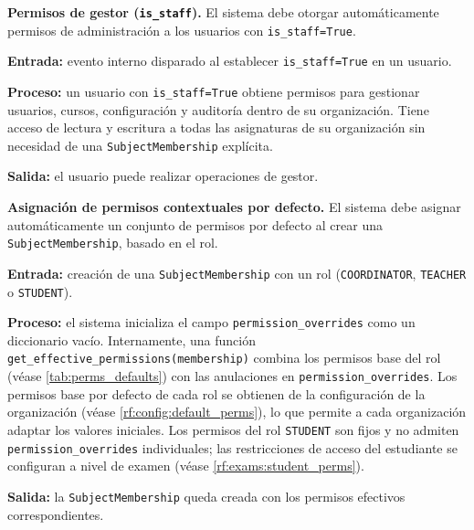 \begin{functional}

    \item \textbf{Permisos de gestor (\texttt{is\_staff}).} \label{rf:perms:staff}
    El sistema debe otorgar automáticamente permisos de administración a los usuarios con
    \texttt{is\_staff=True}.

    \textbf{Entrada:} evento interno disparado al establecer \texttt{is\_staff=True} en un
    usuario.

    \textbf{Proceso:} un usuario con \texttt{is\_staff=True} obtiene permisos para
    gestionar usuarios, cursos, configuración y auditoría dentro de su organización. Tiene
    acceso de lectura y escritura a todas las asignaturas de su organización sin necesidad
    de una \texttt{SubjectMembership} explícita.

    \textbf{Salida:} el usuario puede realizar operaciones de gestor.

    \item \textbf{Asignación de permisos contextuales por defecto.}
    \label{rf:perms:defaults}
    El sistema debe asignar automáticamente un conjunto de permisos por defecto al crear una
    \texttt{SubjectMembership}, basado en el rol.

    \textbf{Entrada:} creación de una \texttt{SubjectMembership} con un rol
    (\texttt{COORDINATOR}, \texttt{TEACHER} o \texttt{STUDENT}).

    \textbf{Proceso:} el sistema inicializa el campo \texttt{permission\_overrides} como un
    diccionario vacío. Internamente, una función
    \texttt{get\_effective\_permissions(membership)} combina los permisos base del rol
    (véase \cref{tab:perms_defaults}) con las anulaciones en
    \texttt{permission\_overrides}. Los permisos base por defecto de cada rol se obtienen de
    la configuración de la organización (véase \cref{rf:config:default_perms}), lo que
    permite a cada organización adaptar los valores iniciales. Los permisos del rol
    \texttt{STUDENT} son fijos y no admiten \texttt{permission\_overrides} individuales;
    las restricciones de acceso del estudiante se configuran a nivel de examen (véase
    \cref{rf:exams:student_perms}).

    \textbf{Salida:} la \texttt{SubjectMembership} queda creada con los permisos efectivos
    correspondientes.


\end{functional}
